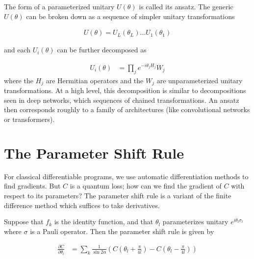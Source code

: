 \documentclass[book.tex]{subfiles}
\begin{document}
The form of a parameterized unitary $U(\theta)$ is called its ansatz. The generic $U(\theta)$ can be broken down as a sequence of simpler unitary transformations

\begin{align}
    U(\theta) = U_L(\theta_L) \dotsc U_1(\theta_1)
\end{align}

and each $U_i(\theta)$ can be further decomposed as

\begin{align}
    U_i(\theta) &= \prod_j e^{-i\theta_jH_j} W_j
\end{align}
where the $H_j$ are Hermitian operators and the $W_j$ are unparameterized unitary transformations. At a high level, this decomposition is similar to decompositions seen in deep networks, which sequences of chained transformations. An ansatz then corresponds roughly to a family of architectures (like convolutional networks or transformers).

\section{The Parameter Shift Rule}

For classical differentiable programs, we use automatic differentiation methods to find gradients. But $C$ is a quantum loss; how can we find the gradient of $C$ with respect to its parameters? The parameter shift rule is a variant of the finite difference method which suffices to take derivatives.

Suppose that $f_k$ is the identity function, and that $\theta_l$ parameterizes unitary $e^{i\theta_l \sigma_l}$ where $\sigma$ is a Pauli operator. Then the parameter shift rule is given by

\begin{align}
    \frac{\partial C}{\partial \theta_l} &= \sum_k \frac{1}{\sin 2 \alpha } \left ( C(\theta_l + \frac{\pi}{4l}) - C(\theta_l - \frac{\pi}{4l}) \right )
\end{align}





\end{document}
